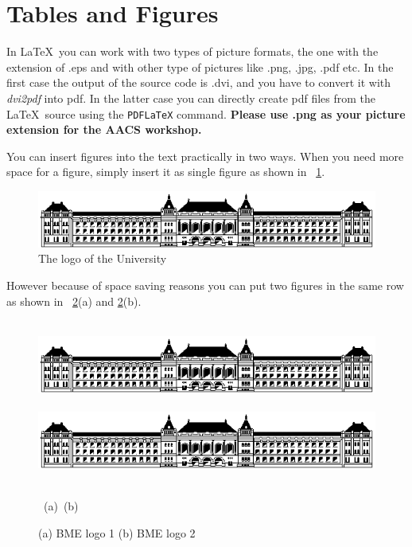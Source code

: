 \documentclass[twoside,b5paper,10pt]{article}
\begin{document}
\section{Tables and Figures}
\label{sec:tables-figures}

In \LaTeX \ you can work with two types of picture formats, the one
with the extension of .eps and with other type of pictures like
.png, .jpg, .pdf etc. In the first case the output of the source
code is .dvi, and you have to convert it with \emph{dvi2pdf} into
pdf. In the latter case you can directly create pdf files from the
\LaTeX \ source using the \verb|PDFLaTeX| command. \textbf{Please
use .png as your picture extension for the AACS workshop.}

You can insert figures into the text practically in two ways. When
you need more space for a figure, simply insert it as single figure
as shown in \figurename~\ref{fig:simple}.

\begin{figure}[htb]
 \centerline{\includegraphics[width=.85\columnwidth]{.//Figure/BMElogo.png}}
 \caption{The logo of the University}
 \label{fig:simple}
\end{figure}

However because of space saving reasons you can put two figures in
the same row as shown in \figurename~\ref{fig:two}(a) and
\ref{fig:two}(b).
\begin{figure}[htb]
  \vspace{3pt}
  \centerline{
  \hbox{
  \hspace{0.0in}
        \includegraphics[width = 0.45\columnwidth]{Figure/BMElogo.png}
        \hspace{0.1\columnwidth}
        \includegraphics[width=0.45\columnwidth]{Figure/BMElogo.png}
    }
  }
  \vspace{3pt}
  \hbox{\hspace{0.2\columnwidth} (a) \hspace{0.5\columnwidth} (b)}
  \caption{ (a) BME logo 1 (b) BME logo 2}
  \label{fig:two}
\end{figure}
\end{document}
